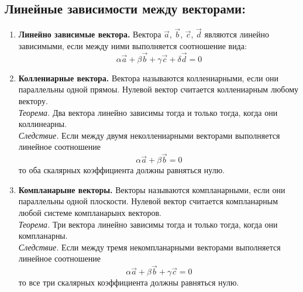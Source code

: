 \documentclass{article}
\begin{document}
\subsection{Линейные зависимости между векторами:}
\begin{enumerate}
    \item \textbf{Линейно зависимые вектора.} Вектора $\vec{a}$, $\vec{b}$, $\vec{c}$, $\vec{d}$ являются линейно зависимыми, если между ними выполняется соотношение вида:
     $$\alpha \vec{a} + \beta \vec{b} + \gamma \vec{c} + \delta \vec{d} = 0$$
     \item \textbf{Коллениарные вектора.} Вектора называются коллениарными, если они параллельны одной прямоы. Нулевой вектор считается коллениарным любому вектору. \\
     \textit{Теорема.} Два вектора линейно зависимы тогда и только тогда, когда они коллинеарны. \\
     \textit{Следствие.} Если между двумя неколлениарными векторами выполняется линейное соотношение
     $$\alpha\vec{a} + \beta\vec{b} = 0$$
     то оба скалярных коэффициента должны равняться нулю.
     \item \textbf{Компланарыне векторы.} Векторы называются компланарными, если они параллельны одной плоскости. Нулевой вектор считается компланарным любой системе компланарынх векторов.\\
     \textit{Теорема.} Три вектора линейно зависимы тогда и только тогда, когда они компланарны. \\
     \textit{Следствие.} Если между тремя некомпланарными векторами выполняется линейное соотношение
     $$\alpha\vec{a} + \beta\vec{b} + \gamma\vec{c} = 0$$
     то все три скалярных коэффициента должны равняться нулю.
\end{enumerate}
\end{document}

